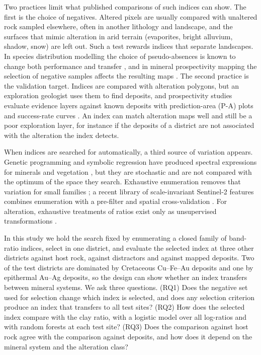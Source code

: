 \documentclass[pdflatex,sn-basic]{sn-jnl}
\begin{document}
Two practices limit what published comparisons of such indices can show. The first is the choice of negatives. Altered pixels are usually compared with unaltered rock sampled elsewhere, often in another lithology and landscape, and the surfaces that mimic alteration in arid terrain (evaporites, bright alluvium, shadow, snow) are left out. Such a test rewards indices that separate landscapes. In species distribution modelling the choice of pseudo-absences is known to change both performance and transfer \citep{Phillips2009,BarbetMassin2012}, and in mineral prospectivity mapping the selection of negative samples affects the resulting maps \citep{Zuo2020,Zhang2025}. The second practice is the validation target. Indices are compared with alteration polygons, but an exploration geologist uses them to find deposits, and prospectivity studies evaluate evidence layers against known deposits with prediction-area (P-A) plots and success-rate curves \citep{Chung2003,Yousefi2015}. An index can match alteration maps well and still be a poor exploration layer, for instance if the deposits of a district are not associated with the alteration the index detects.

When indices are searched for automatically, a third source of variation appears. Genetic programming and symbolic regression have produced spectral expressions for minerals and vegetation \citep{Ross2005,Momm2011,Chrysostomou2026}, but they are stochastic and are not compared with the optimum of the space they search. Exhaustive enumeration removes that variation for small families \citep{Thenkabail2000,Bartlett2024,Kronberger2024}; a recent library of scale-invariant Sentinel-2 features combines enumeration with a pre-filter and spatial cross-validation \citep{Lotfi2026}. For alteration, exhaustive treatments of ratios exist only as unsupervised transformations \citep{Askari2018}.

In this study we hold the search fixed by enumerating a closed family of band-ratio indices, select in one district, and evaluate the selected index at three other districts against host rock, against distractors and against mapped deposits. Two of the test districts are dominated by Cretaceous Cu--Fe--Au deposits and one by epithermal Au--Ag deposits, so the design can show whether an index transfers between mineral systems. We ask three questions. (RQ1) Does the negative set used for selection change which index is selected, and does any selection criterion produce an index that transfers to all test sites? (RQ2) How does the selected index compare with the clay ratio, with a logistic model over all log-ratios and with random forests at each test site? (RQ3) Does the comparison against host rock agree with the comparison against deposits, and how does it depend on the mineral system and the alteration class?
\end{document}
